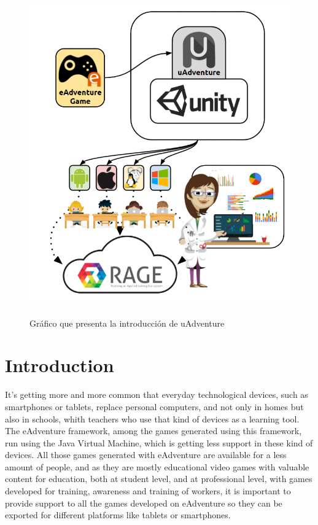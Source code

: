 \begin{figure}[htb]
	\centerline{\includegraphics[height=5.5in]{figures/uAdventuregrafico.png}}
	\caption[Introducción uAdventure]{Gráfico que presenta la introducción de uAdventure}
	\label{intrograph}
\end{figure}

\chapter{Introduction}

It's getting more and more common that everyday technological devices, such as smartphones or tablets, replace personal computers, and not only in homes but also in schools, whith teachers who use that kind of devices as a learning tool. The eAdventure framework, among the games generated using this framework, run using the Java Virtual Machine, which is getting less support in these kind of devices. All those games generated with eAdventure are available for a less amount of people, and as they are mostly educational video games with valuable content for education, both at student level, and at professional level, with games developed for training, awareness and training of workers, it is important to provide support to all the games developed on eAdventure so they can be exported for different platforms like tablets or smartphones.

